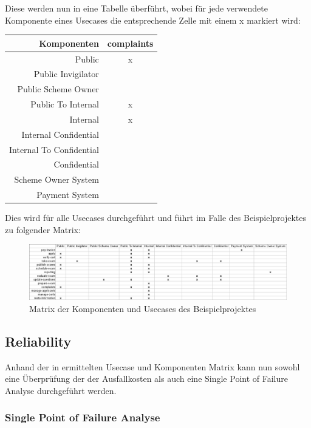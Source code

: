 Diese werden nun in eine Tabelle überführt, wobei für jede verwendete Komponente eines Usecases die entsprechende Zelle mit einem x markiert wird:

\hfill \break

\begin{tabular}{ | r | c | }
    \hline
    Komponenten & complaints \\
    \hline
    Public & x \\
    \hline
    Public Invigilator & \\
    \hline
    Public Scheme Owner & \\
    \hline
    Public To Internal & x \\
    \hline
    Internal & x \\
    \hline
    Internal Confidential & \\
    \hline
    Internal To Confidential & \\
    \hline
    Confidential & \\
    \hline
    Scheme Owner System & \\
    \hline
    Payment System & \\
    \hline
\end{tabular}

\hfill \break

Dies wird für alle Usecases durchgeführt und führt im Falle des Beispielprojektes zu folgender Matrix:

\begin{figure}[H]
    \centering
    \includegraphics[scale=0.4]{img/matrix.png}
    \caption{Matrix der Komponenten und Usecases des Beispielprojektes}
    \label{fig:matrix}
\end{figure}




\subsection{Reliability}
Anhand der in ermittelten Usecase und Komponenten Matrix kann nun sowohl eine Überprüfung der der Ausfallkosten als auch eine Single Point of Failure Analyse durchgeführt werden.

\subsubsection{Single Point of Failure Analyse}

